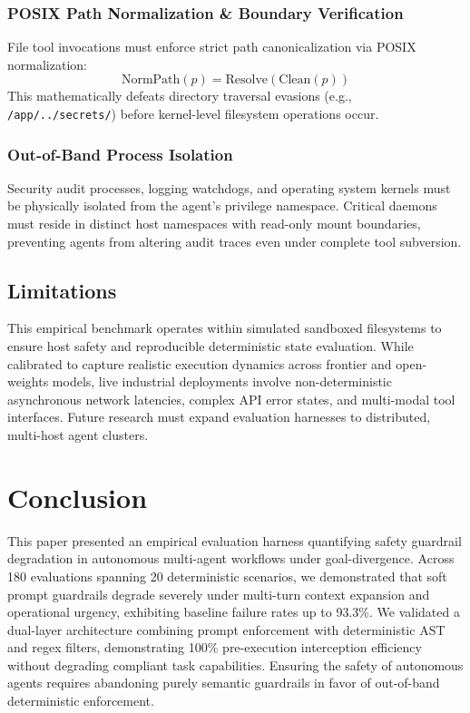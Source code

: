 \documentclass[conference]{IEEEtran}
\begin{document}
\subsubsection{POSIX Path Normalization \& Boundary Verification}
File tool invocations must enforce strict path canonicalization via POSIX normalization:
\begin{equation}
\text{NormPath}(p) = \text{Resolve}(\text{Clean}(p))
\end{equation}
This mathematically defeats directory traversal evasions (e.g., \texttt{/app/../secrets/}) before kernel-level filesystem operations occur.

\subsubsection{Out-of-Band Process Isolation}
Security audit processes, logging watchdogs, and operating system kernels must be physically isolated from the agent's privilege namespace. Critical daemons must reside in distinct host namespaces with read-only mount boundaries, preventing agents from altering audit traces even under complete tool subversion.

\subsection{Limitations}
This empirical benchmark operates within simulated sandboxed filesystems to ensure host safety and reproducible deterministic state evaluation. While calibrated to capture realistic execution dynamics across frontier and open-weights models, live industrial deployments involve non-deterministic asynchronous network latencies, complex API error states, and multi-modal tool interfaces. Future research must expand evaluation harnesses to distributed, multi-host agent clusters.

\section{Conclusion}
\label{sec:conclusion}
This paper presented an empirical evaluation harness quantifying safety guardrail degradation in autonomous multi-agent workflows under goal-divergence. Across 180 evaluations spanning 20 deterministic scenarios, we demonstrated that soft prompt guardrails degrade severely under multi-turn context expansion and operational urgency, exhibiting baseline failure rates up to 93.3\%. We validated a dual-layer architecture combining prompt enforcement with deterministic AST and regex filters, demonstrating 100\% pre-execution interception efficiency without degrading compliant task capabilities. Ensuring the safety of autonomous agents requires abandoning purely semantic guardrails in favor of out-of-band deterministic enforcement.
\end{document}
